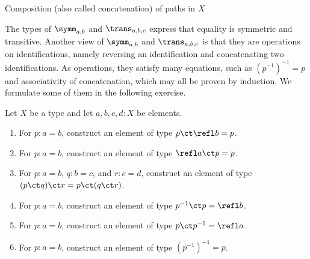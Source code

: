 \begin{marginfigure}
  \caption{Composition (also called concatenation) of paths in $X$}
  \label{fig:path-concatenation}
\end{marginfigure}

The types of $\symm_{a,b}$ and $\trans_{a,b,c}$ express that
equality is symmetric and transitive. Another view of
$\symm_{a,b}$ and $\trans_{a,b,c}$ is that they are
operations on identifications, namely reversing an identification
and concatenating two identifications. As operations, they satisfy
many equations, such as $(p^{-1})^{-1} = p$ and
associativity of concatenation, which may all be proven by induction.
We formulate some of them in the following exercise.

\begin{xca}\label{xca:path-groupoid-laws}
  Let $X$ be a type and let $a,b,c,d:X$ be elements.
  \begin{enumerate}
    \item For $p:a=b$, construct an element of type $p \ct \refl b = p$.
    \item For $p:a=b$, construct an element of type $\refl a \ct p = p$.
    \item For $p:a=b$, $q:b=c$, and $r:c=d$, construct an element of type $(p \ct q) \ct r = p \ct (q \ct r)$.
    \item For $p:a=b$, construct an element of type $p^{-1} \ct p = \refl b$.
    \item For $p:a=b$, construct an element of type $p \ct p^{-1} = \refl a$.
    \item For $p:a=b$, construct an element of type $(p^{-1})^{-1} = p$.
    \qedhere
  \end{enumerate}
\end{xca}

